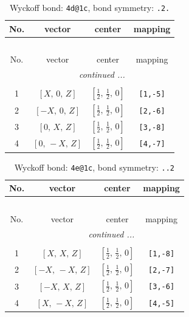 \documentclass[fleqn,8pt]{jsarticle}
\begin{document}
\begin{longtable}{cccc}
\caption{Wyckoff bond: {\tt 4d@1c}, bond symmetry: {\tt .2.}}
 \\
 \hline \hline
No. & vector & center & mapping \\ \hline \endfirsthead

\multicolumn{3}{l}{\tablename\ \thetable{}} \\
 \hline \hline
No. & vector & center & mapping \\ \hline \endhead

 \hline \hline
\multicolumn{3}{r}{\footnotesize\it continued ...} \\ \endfoot

 \hline \hline
\multicolumn{3}{r}{} \\ \endlastfoot

1 & $\left[ X,\, 0,\, Z \right]$ & $\left[ \frac{1}{2},\, \frac{1}{2},\, 0 \right]$ & {\tt [1,-5]} \\ \hline
2 & $\left[ - X,\, 0,\, Z \right]$ & $\left[ \frac{1}{2},\, \frac{1}{2},\, 0 \right]$ & {\tt [2,-6]} \\ \hline
3 & $\left[ 0,\, X,\, Z \right]$ & $\left[ \frac{1}{2},\, \frac{1}{2},\, 0 \right]$ & {\tt [3,-8]} \\ \hline
4 & $\left[ 0,\, - X,\, Z \right]$ & $\left[ \frac{1}{2},\, \frac{1}{2},\, 0 \right]$ & {\tt [4,-7]} \\
\end{longtable}
\renewcommand{\arraystretch}{1.2}
\begin{longtable}{cccc}
\caption{Wyckoff bond: {\tt 4e@1c}, bond symmetry: {\tt ..2}}
 \\
 \hline \hline
No. & vector & center & mapping \\ \hline \endfirsthead

\multicolumn{3}{l}{\tablename\ \thetable{}} \\
 \hline \hline
No. & vector & center & mapping \\ \hline \endhead

 \hline \hline
\multicolumn{3}{r}{\footnotesize\it continued ...} \\ \endfoot

 \hline \hline
\multicolumn{3}{r}{} \\ \endlastfoot

1 & $\left[ X,\, X,\, Z \right]$ & $\left[ \frac{1}{2},\, \frac{1}{2},\, 0 \right]$ & {\tt [1,-8]} \\ \hline
2 & $\left[ - X,\, - X,\, Z \right]$ & $\left[ \frac{1}{2},\, \frac{1}{2},\, 0 \right]$ & {\tt [2,-7]} \\ \hline
3 & $\left[ - X,\, X,\, Z \right]$ & $\left[ \frac{1}{2},\, \frac{1}{2},\, 0 \right]$ & {\tt [3,-6]} \\ \hline
4 & $\left[ X,\, - X,\, Z \right]$ & $\left[ \frac{1}{2},\, \frac{1}{2},\, 0 \right]$ & {\tt [4,-5]} \\
\end{longtable}
\end{document}
